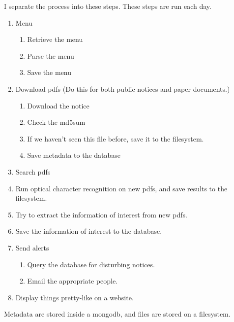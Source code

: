 I separate the process into these steps. These steps are run each day.

\begin{enumerate}
\item Menu
  \begin{enumerate}
  \item Retrieve the menu
  \item Parse the menu
  \item Save the menu
  \end{enumerate}
\item Download pdfs (Do this for both public notices and paper documents.)
  \begin{enumerate}
  \item Download the notice
  \item Check the md5sum
  \item If we haven't seen this file before, save it to the filesystem.
  \item Save metadata to the database
  \end{enumerate}
\item Search pdfs
  \item Run optical character recognition on new pdfs, and save results to the filesystem.
  \item Try to extract the information of interest from new pdfs.
  \item Save the information of interest to the database.
\item Send alerts
  \begin{enumerate}
  \item Query the database for disturbing notices.
  \item Email the appropriate people.
  \end{enumerate}
\item Display things pretty-like on a website.
\end{enumerate}

Metadata are stored inside a mongodb, and files are stored on a filesystem.
